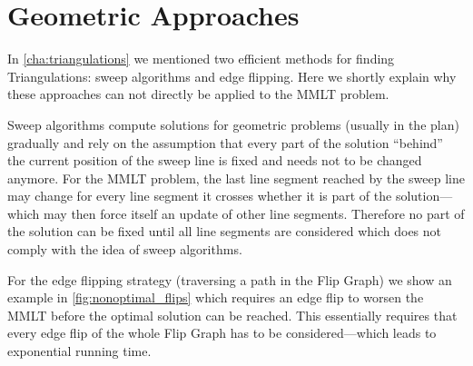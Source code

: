 \section{Geometric Approaches}
In \cref{cha:triangulations} we mentioned two efficient methods for
finding Triangulations: sweep algorithms and edge flipping. Here we
shortly explain why these approaches can not directly be applied to
the \gls{MMLT} problem.

Sweep algorithms compute solutions for geometric problems (usually in
the plan) gradually and rely on the assumption that every part of the
solution ``behind'' the current position of the sweep line is fixed
and needs not to be changed anymore. For the \gls{MMLT} problem, the
last line segment reached by the sweep line may change for every line
segment it crosses whether it is part of the solution---which may then
force itself an update of other line segments. Therefore no part of
the solution can be fixed until all line segments are considered which
does not comply with the idea of sweep algorithms.

For the edge flipping strategy (traversing a path in the Flip Graph)
we show an example in \cref{fig:nonoptimal_flips} which requires an
edge flip to worsen the \gls{MMLT} before the optimal solution can be
reached. This essentially requires that every edge flip of the whole
Flip Graph has to be considered---which leads to exponential running
time.

